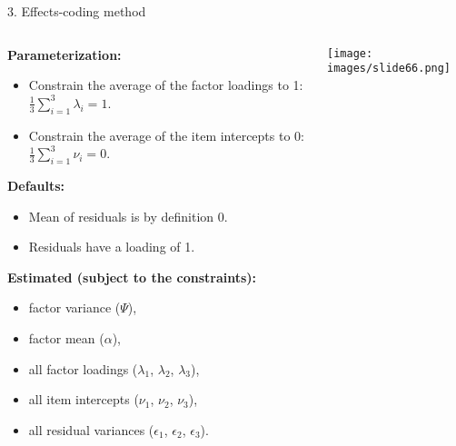 \documentclass[10pt]{beamer}\usepackage[]{graphicx}\usepackage[]{xcolor}
\begin{document}
%
\begin{frame}{3. Effects-coding method}

    \begin{columns}[T] %
    \begin{column}{.65\textwidth}
    
    \textbf{Parameterization:}
        \begin{itemize}
            \item Constrain the average of the factor loadings to 1:
            $\frac{1}{3} \sum_{i=1}^3 \lambda_i = 1$. %
            \item Constrain the average of the item intercepts to 0:
            $\frac{1}{3} \sum_{i=1}^3 \nu_i = 0$.
        \end{itemize} 
        \textbf{Defaults:}
        \begin{itemize}
            \item Mean of residuals is by definition 0.
            \item Residuals have a loading of 1.
        \end{itemize} 
        \textbf{Estimated (subject to the constraints):}
        \begin{itemize}
            \item factor variance ($\Psi$),
            \item factor mean ($\alpha$),
            \item all factor loadings ($\lambda_1$, $\lambda_2$, $\lambda_3$),
            \item all item intercepts ($\nu_1$, $\nu_2$, $\nu_3$), 
            \item all residual variances ($\epsilon_1$, $\epsilon_2$, $\epsilon_3$).
        \end{itemize}
    
    \end{column}%
    
    \hfill%
    \begin{column}{.34\textwidth}
        \texttt{[image: images/slide66.png]} 
    \end{column}%
    \end{columns}
    
\end{frame}
%
\end{document}
